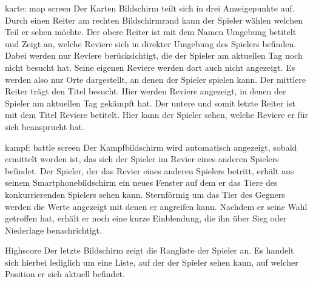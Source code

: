 karte: map screen
Der Karten Bildschirm teilt sich in drei Anzeigepunkte auf. Durch einen Reiter am rechten Bildschirmrand kann der Spieler wählen welchen Teil er sehen möchte. Der obere Reiter ist mit dem Namen Umgebung betitelt und Zeigt an, welche Reviere sich in direkter Umgebung des Spielers befinden. Dabei werden nur Reviere berücksichtigt, die der Spieler am aktuellen Tag noch nicht besucht hat. Seine eigenen Reviere werden dort auch nicht angezeigt. Es werden also nur Orte dargestellt, an denen der Spieler spielen kann. Der mittlere Reiter trägt den Titel besucht. Hier werden Reviere angezeigt, in denen der Spieler am aktuellen Tag gekämpft hat. Der untere und somit letzte Reiter ist mit dem Titel Reviere betitelt. Hier kann der Spieler sehen, welche Reviere er für sich beansprucht hat. 

kampf: battle screen
Der Kampfbildschirm wird automatisch angezeigt, sobald ermittelt worden ist, das sich der Spieler im Revier eines anderen Spielers befindet. Der Spieler, der das Revier eines anderen Spielers betritt, erhält aus seinem Smartphonebildschirm ein neues Fenster auf dem er das Tiere des konkurrierenden Spielers sehen kann. Sternförmig um das Tier des Gegners werden die Werte angezeigt mit denen er angreifen kann. Nachdem er seine Wahl getroffen hat, erhält er noch eine kurze Einblendung, die ihn über Sieg oder Niederlage benachrichtigt.

Highscore
Der letzte Bildschirm zeigt die Rangliste der Spieler an. Es handelt sich hierbei lediglich um eine Liste, auf der der Spieler sehen kann, auf welcher Position er sich aktuell befindet. 


